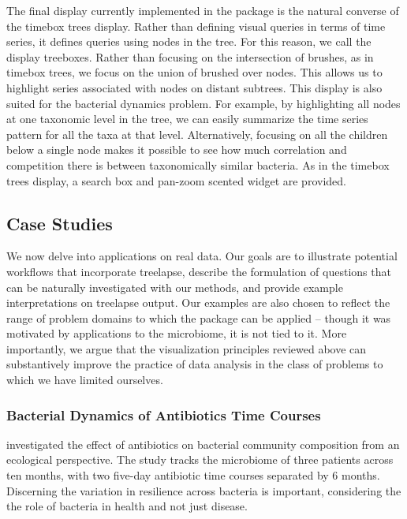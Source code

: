 \documentclass[12pt]{article}
\begin{document}
The final display currently implemented in the package is the natural
converse of the timebox trees display. Rather than defining visual
queries in terms of time series, it defines queries using nodes in the
tree. For this reason, we call the display treeboxes. Rather than
focusing on the intersection of brushes, as in timebox trees, we focus
on the union of brushed over nodes. This allows us to highlight series
associated with nodes on distant subtrees. This display is also suited
for the bacterial dynamics problem. For example, by highlighting all
nodes at one taxonomic level in the tree, we can easily summarize the
time series pattern for all the taxa at that level. Alternatively,
focusing on all the children below a single node makes it possible to
see how much correlation and competition there is between taxonomically
similar bacteria. As in the timebox trees display, a search box and
pan-zoom scented widget are provided.

\subsection*{Case Studies}\label{case-studies}

We now delve into applications on real data. Our goals are to illustrate
potential workflows that incorporate treelapse, describe the formulation
of questions that can be naturally investigated with our methods, and
provide example interpretations on treelapse output. Our examples are
also chosen to reflect the range of problem domains to which the package
can be applied -- though it was motivated by applications to the
microbiome, it is not tied to it. More importantly, we argue that the
visualization principles reviewed above can substantively improve the
practice of data analysis in the class of problems to which we have
limited ourselves.

\subsubsection*{Bacterial Dynamics of Antibiotics Time
Courses}\label{bacterial-dynamics-of-antibiotics-time-courses}

\citet{dethlefsen2008pervasive} investigated the
effect of antibiotics on bacterial community composition from an
ecological perspective. The study tracks the microbiome of three
patients across ten months, with two five-day antibiotic time courses
separated by 6 months. Discerning the variation in resilience across
bacteria is important, considering the the role of bacteria in health
and not just disease.
\end{document}
